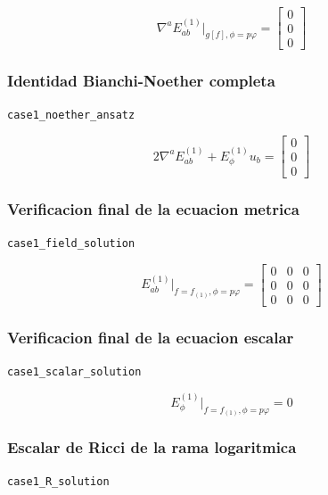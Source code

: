 \documentclass[11pt,a4paper]{article}
\begin{document}
\[
\nabla^aE^{(1)}_{ab}\big|_{g[f],\phi=p\varphi} = \left[\begin{matrix}0\\0\\0\end{matrix}\right]
\]

\subsubsection{Identidad Bianchi-Noether completa}

\noindent\texttt{case1\_noether\_ansatz}\par\nopagebreak[4]

\[
2\nabla^aE^{(1)}_{ab}+E^{(1)}_\phi u_b = \left[\begin{matrix}0\\0\\0\end{matrix}\right]
\]

\subsubsection{Verificacion final de la ecuacion metrica}

\noindent\texttt{case1\_field\_solution}\par\nopagebreak[4]

\[
E^{(1)}_{ab}\big|_{f=f_{(1)},\phi=p\varphi} = \left[\begin{matrix}0 & 0 & 0\\0 & 0 & 0\\0 & 0 & 0\end{matrix}\right]
\]

\subsubsection{Verificacion final de la ecuacion escalar}

\noindent\texttt{case1\_scalar\_solution}\par\nopagebreak[4]

\[
E^{(1)}_\phi\big|_{f=f_{(1)},\phi=p\varphi} = 0
\]

\subsubsection{Escalar de Ricci de la rama logaritmica}

\noindent\texttt{case1\_R\_solution}\par\nopagebreak[4]
\end{document}
